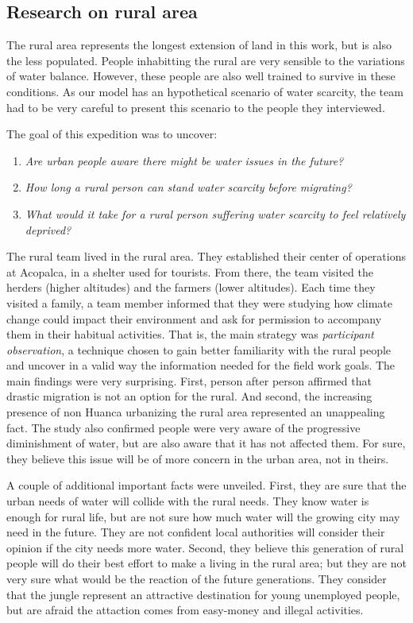 \documentclass{article}
\begin{document}
\subsection{Research on rural area}

The rural area represents the longest extension of land in this work, but is also the less populated. People inhabitting the rural are very sensible to the variations of water balance. However, these people are also well trained to survive in these conditions.  As our model has an hypothetical scenario of water scarcity, the team had to be very careful to present this scenario to the people they interviewed. 

The goal of this expedition was to uncover:
\begin{enumerate}
\item \emph{Are urban people aware there might be water issues in the future?}
\item \emph{How long a rural person can stand water scarcity before migrating?}
\item \emph{What would it take for a rural person suffering water scarcity to feel relatively deprived?}
\end {enumerate}


The rural team lived in the rural area. They established their center of operations at Acopalca, in a shelter used for tourists. From there, the team visited the herders (higher altitudes) and the farmers (lower altitudes). Each time they visited a family, a team member informed that they were studying how climate change could impact their environment and ask for permission to accompany them in their habitual activities. That is, the main strategy was \emph{participant observation}, a technique chosen to gain better familiarity with the rural people and uncover in a valid way the information needed for the field work goals. The main findings were very surprising. First, person after person affirmed that drastic migration is not an option for the rural. And second, the increasing presence of non Huanca urbanizing the rural area represented an unappealing fact. The study also confirmed people were very aware of the progressive diminishment of water, but are also aware that it has not affected them. For sure, they believe this issue will be of more concern in the urban area, not in theirs.

A couple of additional important facts were unveiled. First, they are sure that the urban needs of water will collide with the rural needs. They know water is enough for rural life, but are not sure how much water will the growing city may need in the future. They are not confident local authorities will consider their opinion if the city needs more water. Second, they believe this generation of rural people will do their best effort to make a living in the rural area; but they are not very sure what would be the reaction of the future generations. They consider that the jungle represent an attractive destination for young unemployed people, but are afraid the attaction comes from easy-money and illegal activities.
\end{document}
